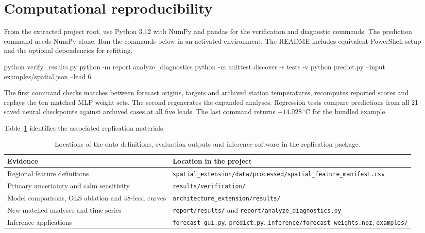 \documentclass[11pt,letterpaper]{article}
\newcommand{\thead}[1]{\textbf{#1}}\newcommand{\bestscore}[1]{\textbf{#1}}
\newcommand{\celsius}{\ensuremath{^{\circ}\mathrm{C}}}\newcommand{\code}[1]{\texttt{\small #1}}
\begin{document}
\section{Computational reproducibility}\label{reproduce}
From the extracted project root, use Python 3.12 with NumPy and pandas for the verification and diagnostic commands. The prediction command needs NumPy alone. Run the commands below in an activated environment. The README includes equivalent PowerShell setup and the optional dependencies for refitting.
\begin{codeblock}
python verify_results.py
python -m report.analyze_diagnostics
python -m unittest discover -s tests -v
python predict.py --input examples/spatial.json --lead 6
\end{codeblock}
The first command checks matches between forecast origins, targets and archived station temperatures, recomputes reported scores and replays the ten matched MLP weight sets. The second regenerates the expanded analyses. Regression tests compare predictions from all 21 saved neural checkpoints against archived cases at all five leads. The last command returns $-14.028$\,\celsius{} for the bundled example.

Table~\ref{tab:files} identifies the associated replication materials.



\begin{table}[!htbp]
\centering\small
\caption{Locations of the data definitions, evaluation outputs and inference software in the replication package.}\label{tab:files}
\renewcommand{\arraystretch}{1.14}\begin{tabularx}{.98\linewidth}{@{}p{1.46in}X@{}}\toprule\thead{Evidence}&\thead{Location in the project}\\\midrule
Regional feature definitions & \code{spatial\_extension/data/processed/spatial\_feature\_manifest.csv}\\
Primary uncertainty and calm sensitivity & \code{results/verification/}\\
Model comparisons, OLS ablation and 48-lead curves & \code{architecture\_extension/results/}\\
New matched analyses and time series & \code{report/results/} and \code{report/analyze\_diagnostics.py}\\
Inference applications & \code{forecast\_gui.py}, \code{predict.py}, \code{inference/forecast\_weights.npz}, \code{examples/}\\\bottomrule\end{tabularx}
\end{table}
\end{document}
